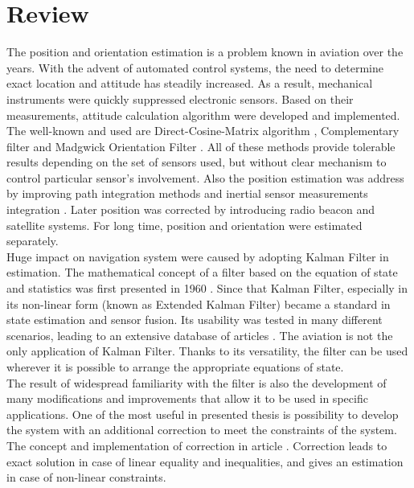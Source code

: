 \section{Review}

The position and orientation estimation is a problem known in aviation over the years. With the advent of automated control systems, the need to determine exact location and attitude has steadily increased. As a result, mechanical instruments were quickly suppressed electronic sensors. Based on their measurements, attitude calculation algorithm were developed and implemented. The well-known and used are Direct-Cosine-Matrix algorithm \cite{dcm}, Complementary filter \cite{complementary} and Madgwick Orientation Filter \cite{madgwick} \cite{Hasan2020}. All of these methods provide tolerable results depending on the set of sensors used, but without clear mechanism to control particular sensor's involvement.
Also the position estimation was address by improving path integration methods and inertial sensor measurements integration \cite{farrell2012integrated}. Later position was corrected by introducing radio beacon and satellite systems. For long time, position and orientation were estimated separately.\\

Huge impact on navigation system were caused by adopting Kalman Filter in estimation. The mathematical concept of a filter based on the equation of state and statistics was first presented in 1960 \cite{kalman}. Since that Kalman Filter, especially in its non-linear form (known as Extended Kalman Filter) became a standard in state estimation and sensor fusion. Its usability was tested in many different scenarios, leading to an extensive database of articles \cite{ekf_poor} \cite{s16020264} \cite{s120709566}. The aviation is not the only application of Kalman Filter. Thanks to its versatility, the filter can be used wherever it is possible to arrange the appropriate equations of state.\\

The result of widespread familiarity with the filter is also the development of many modifications and improvements that allow it to be used in specific applications. One of the most useful in presented thesis is possibility to develop the system with an additional correction to meet the constraints of the system. The concept and implementation of correction in article \cite{simon}. Correction leads to exact solution in case of linear equality and inequalities, and gives an estimation in case of non-linear constraints.\\

